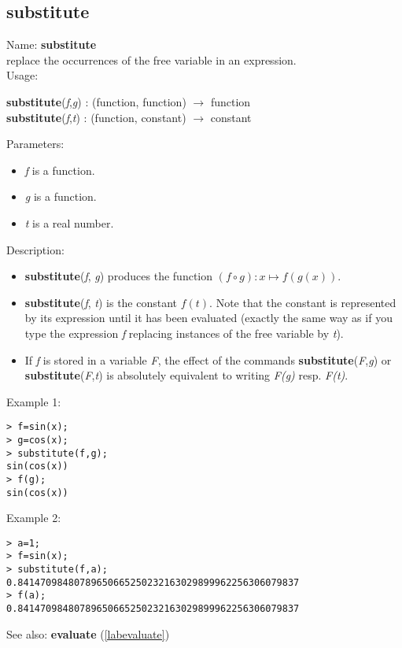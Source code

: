 \subsection{substitute}
\label{labsubstitute}
\noindent Name: \textbf{substitute}\\
replace the occurrences of the free variable in an expression.\\
\noindent Usage: 
\begin{center}
\textbf{substitute}(\emph{f},\emph{g}) : (\textsf{function}, \textsf{function}) $\rightarrow$ \textsf{function}\\
\textbf{substitute}(\emph{f},\emph{t}) : (\textsf{function}, \textsf{constant}) $\rightarrow$ \textsf{constant}\\
\end{center}
Parameters: 
\begin{itemize}
\item \emph{f} is a function.
\item \emph{g} is a function.
\item \emph{t} is a real number.
\end{itemize}
\noindent Description: \begin{itemize}

\item \textbf{substitute}(\emph{f}, \emph{g}) produces the function $(f \circ g) : x \mapsto f(g(x))$.

\item \textbf{substitute}(\emph{f}, \emph{t}) is the constant $f(t)$. Note that the constant is
   represented by its expression until it has been evaluated (exactly the same
   way as if you type the expression \emph{f} replacing instances of the free variable 
   by \emph{t}).

\item If \emph{f} is stored in a variable \emph{F}, the effect of the commands \textbf{substitute}(\emph{F},\emph{g}) or \textbf{substitute}(\emph{F},\emph{t}) is absolutely equivalent to 
   writing \emph{F(g)} resp. \emph{F(t)}.
\end{itemize}
\noindent Example 1: 
\begin{center}\begin{minipage}{15cm}\begin{Verbatim}[frame=single]
> f=sin(x);
> g=cos(x);
> substitute(f,g);
sin(cos(x))
> f(g);
sin(cos(x))
\end{Verbatim}
\end{minipage}\end{center}
\noindent Example 2: 
\begin{center}\begin{minipage}{15cm}\begin{Verbatim}[frame=single]
> a=1;
> f=sin(x);
> substitute(f,a);
0.84147098480789650665250232163029899962256306079837
> f(a);
0.84147098480789650665250232163029899962256306079837
\end{Verbatim}
\end{minipage}\end{center}
See also: \textbf{evaluate} (\ref{labevaluate})
